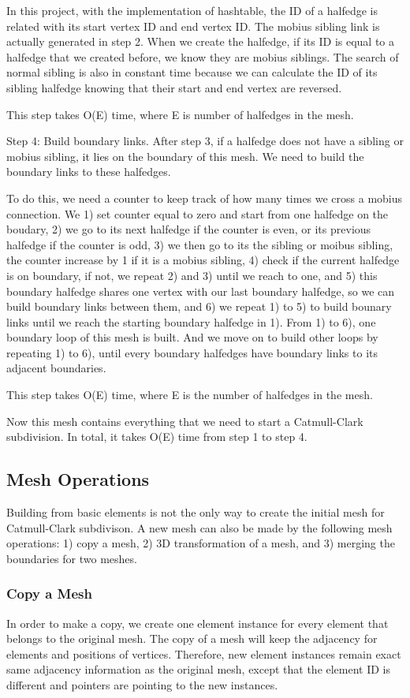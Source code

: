 \documentclass[12pt]{article}
\begin{document}
In this project, with the implementation of hashtable, the ID of a halfedge is related with its start vertex ID and end vertex ID. The mobius sibling link is actually generated in step 2. When we create the halfedge, if its ID is equal to a halfedge that we created before, we know they are mobius siblings. The search of normal sibling is also in constant time because we can calculate the ID of its sibling halfedge knowing that their start and end vertex are reversed. 

This step takes O(E) time, where E is number of halfedges in the mesh.

Step 4: Build boundary links. After step 3, if a halfedge does not have a sibling or mobius sibling, it lies on the boundary of this mesh. We need to build the boundary links to these halfedges.

To do this, we need a counter to keep track of how many times we cross a mobius connection. We 1) set counter equal to zero and start from one halfedge on the boudary, 2) we go to its next halfedge if the counter is even, or its previous halfedge if the counter is odd, 3) we then go to its the sibling or moibus sibling, the counter increase by 1 if it is a mobius sibling, 4) check if the current halfedge is on boundary, if not, we repeat 2) and 3) until we reach to one, and 5) this boundary halfedge shares one vertex with our last boundary halfedge, so we can build boundary links between them, and 6) we repeat 1) to 5) to build bounary links until we reach the starting boundary halfedge in 1). From 1) to 6), one boundary loop of this mesh is built. And we move on to build other loops by repeating 1) to 6), until every boundary halfedges have boundary links to its adjacent boundaries.

This step takes O(E) time, where E is the number of halfedges in the mesh.

Now this mesh contains everything that we need to start a Catmull-Clark subdivision. In total, it takes O(E) time from step 1 to step 4.

\subsection{Mesh Operations}
Building from basic elements is not the only way to create the initial mesh for Catmull-Clark subdivison. A new mesh can also be made by the following mesh operations: 1) copy a mesh, 2) 3D transformation of a mesh, and 3) merging the boundaries for two meshes. 

\subsubsection{Copy a Mesh}
In order to make a copy, we create one element instance for every element that belongs to the original mesh. The copy of a mesh will keep the adjacency for elements and positions of vertices. Therefore, new element instances remain exact same adjacency information as the original mesh, except that the element ID is different and pointers are pointing to the new instances. 
\end{document}
